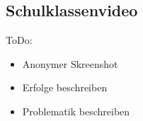 \subsection{Schulklassenvideo}
ToDo: 
\begin{itemize}
	\item Anonymer Skreenshot
	\item Erfolge beschreiben
	\item Problematik beschreiben
\end{itemize}